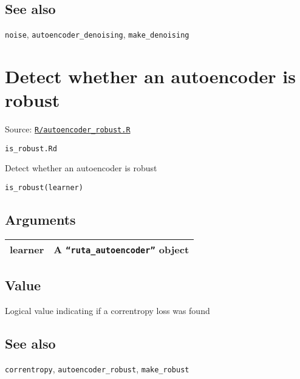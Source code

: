 \hypertarget{see-also}{\subsection{\texorpdfstring{\protect\hyperlink{see-also}{}See
also}{See also}}\label{see-also}}

\texttt{noise}, \texttt{autoencoder\_denoising},
\texttt{make\_denoising}

\section{Detect whether an autoencoder is
robust}\label{detect-whether-an-autoencoder-is-robust}

Source:
\href{https://github.com/fdavidcl/ruta/blob/master/R/autoencoder_robust.R}{\texttt{R/autoencoder\_robust.R}}

\texttt{is\_robust.Rd}

Detect whether an autoencoder is robust

\begin{verbatim}
is_robust(learner)
\end{verbatim}

\hypertarget{arguments}{\subsection{\texorpdfstring{\protect\hyperlink{arguments}{}Arguments}{Arguments}}\label{arguments}}

\begin{longtable}[c]{@{}>{\small}p{3cm}>{\raggedright}p{12.5cm}@{}}
\toprule
learner & A \texttt{``ruta\_autoencoder''} object\tabularnewline
\bottomrule
\end{longtable}

\hypertarget{value}{\subsection{\texorpdfstring{\protect\hyperlink{value}{}Value}{Value}}\label{value}}

Logical value indicating if a correntropy loss was found

\hypertarget{see-also}{\subsection{\texorpdfstring{\protect\hyperlink{see-also}{}See
also}{See also}}\label{see-also}}

\texttt{correntropy}, \texttt{autoencoder\_robust},
\texttt{make\_robust}

